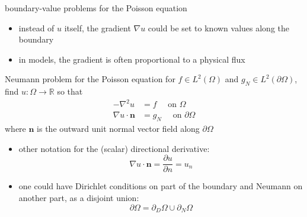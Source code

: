 \documentclass[10pt,
               svgnames,
               hyperref={colorlinks,
                         citecolor=DeepPink4,
                         linkcolor=FireBrick,
                         urlcolor=blue},
               usepdftitle=false]{beamer}
\newcommand{\bn}{\mathbf{n}}
\newcommand{\RR}{\mathbb{R}}
\newcommand{\grad}{\nabla}
\begin{document}
\begin{frame}{boundary-value problems for the Poisson equation}

\begin{itemize}
\item instead of $u$ itself, the gradient $\grad u$ could be set to known values along the boundary
\item in models, the gradient is often proportional to a physical flux
\end{itemize}

\begin{block}{Neumann problem for the Poisson equation}
for $f\in L^2(\Omega)$ and $g_N\in L^2(\partial\Omega)$, find $u:\Omega\to \RR$ so that
\begin{align*}
- \grad^2 u &= f \quad \text{ on } \Omega \\
\grad u\cdot \bn &= g_N \quad \text{ on } \partial \Omega
\end{align*}
where $\bn$ is the outward unit normal vector field along $\partial\Omega$
\end{block}

\begin{itemize}
\item other notation for the (scalar) directional derivative:
	$$\grad u\cdot \bn = \frac{\partial u}{\partial n} = u_n$$
\item one could have Dirichlet conditions on part of the boundary and Neumann on another part, as a disjoint union:
	$$\partial \Omega = \partial_D \Omega \cup \partial_N \Omega$$
\end{itemize}
\end{frame}
\end{document}
